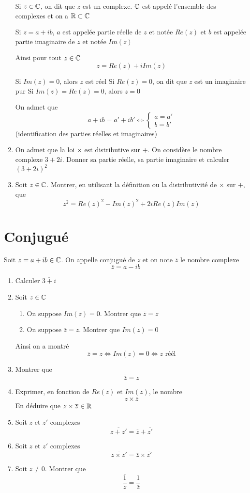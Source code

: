 \begin{enumerate}
Si $z\in \mathbb{C}$, on dit que $z$ est un complexe. $\mathbb{C}$ est appelé l'ensemble des complexes et on a $\mathbb{R} \subset \mathbb{C}$\newline

Si $z = a+ib$, $a$ est appelée partie réelle de $z$ et notée $Re(z)$ et $b$ est appelée partie imaginaire de $z$ et notée $Im(z)$\newline

Ainsi pour tout $z\in\mathbb{C}$ $$\boxed{z = Re(z) + i Im(z)}$$

Si $Im(z) = 0$, alors $z$ est réel\newline
Si $Re(z) = 0$, on dit que $z$ est un imaginaire pur
Si $Im(z) = Re(z) = 0$, alors $z = 0$\newline

On admet que $$a+ib = a'+ib' \Leftrightarrow \left\{ \begin{array}{l} a = a' \\ b = b' \end{array} \right.$$
(identification des parties réelles et imaginaires)\newline

\item On admet que la loi $\times$ est distributive sur $+$. On considère le nombre complexe $3+2i$. Donner sa partie réelle, sa partie imaginaire et calculer $(3+2i)^2$
\item Soit $z\in\mathbb{C}$. Montrer, en utilisant la définition ou la distributivité de $\times$ sur $+$, que  
$$\boxed{z^2 = Re(z)^2 - Im(z)^2 + 2iRe(z)Im(z)}$$
\end{enumerate}
\section{Conjugué}
Soit $z = a+ib \in \mathbb{C}$. On appelle conjugué de $z$ et on note $\overline{z}$ le nombre complexe $$\overline{z} = a - ib$$
\begin{enumerate}
\item Calculer $\overline{3 + i}$
\item Soit $z\in\mathbb{C}$ \begin{enumerate} \item On suppose $Im(z) = 0$. Montrer que $\overline{z} = z$ \item On suppose $\overline{z} = z$. Montrer que $Im(z) = 0$\end{enumerate} Ainsi on a montré $$\boxed{\overline{z} = z \Leftrightarrow Im(z) = 0 \Leftrightarrow z \text{ réél}}$$
\item Montrer que $$\overline{\overline{z}} = z$$
\item Exprimer, en fonction de $Re(z)$ et $Im(z)$, le nombre 
$$z \times \overline{z}$$
En déduire que $z \times \overline{z}\in\mathbb{R}$
\item Soit $z$ et $z'$ complexes $$\overline{z + z'} = \overline{z} + \overline{z'}$$
\item Soit $z$ et $z'$ complexes $$\overline{z \times z'} = \overline{z} \times \overline{z'}$$
\item Soit $z\neq 0$. Montrer que 
$$\overline{\frac{1}{z}} = \frac{1}{\overline{z}}$$
\end{enumerate}
